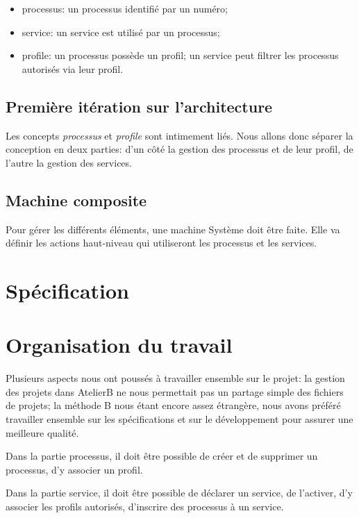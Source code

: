 \documentclass[french, 11pt, a4paper]{article}
\begin{document}
\begin{itemize}
  \item processus: un processus identifié par un numéro;
  \item service: un service est utilisé par un processus;
  \item profile: un processus possède un profil; un service peut filtrer les
    processus autorisés via leur profil.
\end{itemize}

\subsection{Première itération sur l'architecture}
Les concepts \emph{processus} et \emph{profile} sont intimement liés. Nous
allons donc séparer la conception en deux parties: d'un côté la gestion des
processus et de leur profil, de l'autre la gestion des services.

    \subsection{Machine composite}

        Pour gérer les différents éléments, une machine Système doit être faite.
        Elle va définir les actions haut-niveau qui utiliseront les processus et
        les services.


\section{Spécification}

    \subsection{}



\section{Organisation du travail}
    Plusieurs aspects nous ont poussés à travailler ensemble sur le projet: la
    gestion des projets dans AtelierB ne nous permettait pas un partage simple
    des fichiers de projets; la méthode B nous étant encore assez étrangère,
    nous avons préféré travailler ensemble sur les spécifications et sur le
    développement pour assurer une meilleure qualité.


Dans la partie processus, il doit être possible de créer et de supprimer un
processus, d'y associer un profil.

Dans la partie service, il doit être possible de déclarer un service, de
l'activer, d'y associer les profils autorisés, d'inscrire des processus à un
service.
\end{document}
